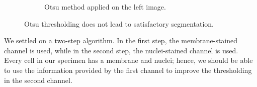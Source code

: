 \documentclass[
  digital,     %
  oneside,     %
  nosansbold,  %
  nocolorbold, %
  lof,         %
  lot,         %
]{fithesis4}
\begin{document}
\begin{figure}
\begin{subfigure}[t]{0.45\textwidth}
        \caption{Otsu method applied on the left image.}
        \label{fig:otsu-naive}
    \end{subfigure}
    \caption{Otsu thresholding does not lead to satisfactory segmentation.}
    \label{fig:otsu-nuclei-demo}
\end{figure}
We settled on a two-step algorithm. In the first step, the membrane-stained
channel is used, while in the second step, the nuclei-stained channel is used.
Every cell in our specimen has a membrane and nuclei; hence, we should be able
to use the information provided by the first channel to improve the thresholding
in the second channel.
\end{document}
